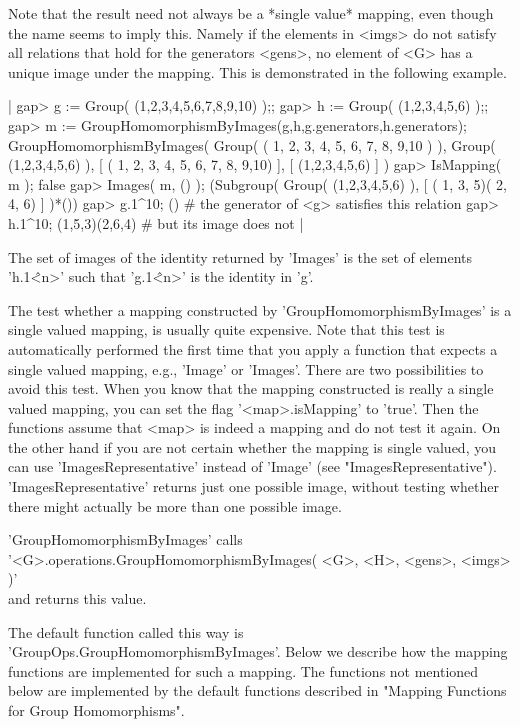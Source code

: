 Note that  the result need not  always be a *single value*  mapping, even
though the name seems to imply this.  Namely if the elements in <imgs> do
not satisfy all relations that hold for the generators <gens>, no element
of <G> has a unique image under the mapping.  This is demonstrated in the
following example.

|    gap> g := Group( (1,2,3,4,5,6,7,8,9,10) );;
    gap> h := Group( (1,2,3,4,5,6) );;
    gap> m := GroupHomomorphismByImages(g,h,g.generators,h.generators);
    GroupHomomorphismByImages( Group( ( 1, 2, 3, 4, 5, 6, 7, 8, 9,10
     ) ), Group( (1,2,3,4,5,6) ), [ ( 1, 2, 3, 4, 5, 6, 7, 8, 9,10) ],
    [ (1,2,3,4,5,6) ] )
    gap> IsMapping( m );
    false
    gap> Images( m, () );
    (Subgroup( Group( (1,2,3,4,5,6) ), [ ( 1, 3, 5)( 2, 4, 6) ] )*())
    gap> g.1^10;
    ()    # the generator of <g> satisfies this relation
    gap> h.1^10;
    (1,5,3)(2,6,4)    # but its image does not |

The set  of images of the identity  returned  by 'Images'  is the set  of
elements 'h.1\^<n>' such that 'g.1\^<n>' is the identity in 'g'.

The test whether  a mapping constructed by 'GroupHomomorphismByImages' is
a single valued mapping, is usually quite expensive.  Note that this test
is  automatically performed the first time that you apply a function that
expects a single valued mapping, e.g., 'Image'  or  'Images'.  There  are
two possibilities to  avoid this  test.   When  you know that the mapping
constructed is really  a  single  valued  mapping,  you can  set the flag
'<map>.isMapping'  to 'true'.   Then  the functions  assume that <map> is
indeed a mapping and do not test it again.  On the other hand  if you are
not  certain  whether  the   mapping  is  single  valued,  you   can  use
'ImagesRepresentative'  instead of 'Image'  (see "ImagesRepresentative").
'ImagesRepresentative' returns  just one possible image,  without testing
whether there might actually be more than one possible image.

'GroupHomomorphismByImages' calls \\
'<G>.operations.GroupHomomorphismByImages( <G>, <H>, <gens>, <imgs> )' \\
and returns this value.

The      default      function       called       this       way       is
'GroupOps.GroupHomomorphismByImages'.  Below we describe how the  mapping
functions  are  implemented  for  such  a  mapping.   The  functions  not
mentioned below  are implemented by  the  default functions described  in
"Mapping Functions for Group Homomorphisms".

